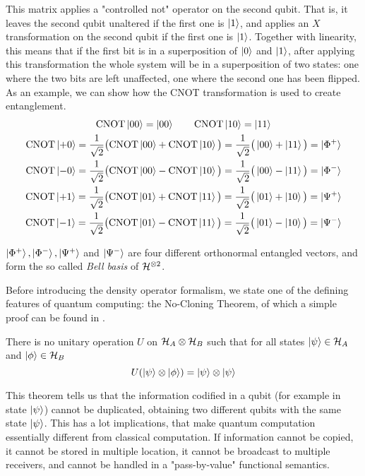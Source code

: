 This matrix applies a "controlled not" operator on the second qubit. That is, it leaves the second qubit unaltered if the first one is $\ket{1}$, and applies an $X$ transformation on the second qubit if the first one is $\ket{1}$. Together with linearity, this means that if the first bit is in a superposition of $\ket{0}$ and $\ket{1}$, after applying this transformation the whole system will be in a superposition of two states: one where the two bits are left unaffected, one where the second one has been flipped. As an example, we can show how the CNOT transformation is used to create entanglement.
\begin{gather*}
\text{CNOT} \ket{00} = \ket{00} \qquad \text{CNOT} \ket{10} = \ket{11} 
\\
\text{CNOT} \ket{+0} = \frac{1}{\sqrt{2}}\big(\text{CNOT}\ket{00} + \text{CNOT}\ket{10}\big) = \frac{1}{\sqrt{2}}
\big(\ket{00} + \ket{11}\big) = \ket{\Phi^+}
\\
\text{CNOT} \ket{-0} = \frac{1}{\sqrt{2}}\big(\text{CNOT}\ket{00} - \text{CNOT}\ket{10}\big) = \frac{1}{\sqrt{2}}
\big(\ket{00} - \ket{11}\big) = \ket{\Phi^-}
\\
\text{CNOT} \ket{+1} = \frac{1}{\sqrt{2}}\big(\text{CNOT}\ket{01} + \text{CNOT}\ket{11}\big) = \frac{1}{\sqrt{2}}
\big(\ket{01} + \ket{10}\big) = \ket{\Psi^+}
\\
\text{CNOT} \ket{-1} = \frac{1}{\sqrt{2}}\big(\text{CNOT}\ket{01} - \text{CNOT}\ket{11}\big) = \frac{1}{\sqrt{2}}
\big(\ket{01} - \ket{10}\big) = \ket{\Psi^-}
\end{gather*}

$\ket{\Phi^+}, \ket{\Phi^-}, \ket{\Psi^+}$ and 
$\ket{\Psi^-}$ are four different orthonormal entangled vectors, and form the so called \textit{Bell basis} of $\mathcal{H}^{\otimes 2}$.

Before introducing the density operator formalism, we state one of the defining features of quantum computing: the No-Cloning Theorem, of which a simple proof can be found in \cite{nielsenQuantumComputationQuantum2010}.

\begin{theorem}\label{noCloning}
There is no unitary operation $U$ on $\mathcal{H}_A \otimes \mathcal{H}_B$ such that for all states $\ket{\psi} \in \mathcal{H}_A$ and $\ket{\phi} \in \mathcal{H}_B$
\[U(\ket{\psi} \otimes \ket{\phi}) = \ket{\psi} \otimes \ket{\psi}
\]
\end{theorem}

This theorem tells us that the information codified in a qubit (for example in state $\ket{\psi}$) cannot be duplicated, obtaining two different qubits with the same state $\ket{\psi}$. This has a lot implications, that make quantum computation essentially different from classical computation. If information cannot be copied, it cannot be stored in multiple location, it cannot be broadcast to multiple receivers, and cannot be handled in a "pass-by-value" functional semantics. 

